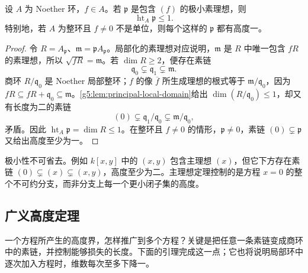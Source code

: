 \begin{theorem}\label{g5:thm:principal-ideal}
	设 \(A\) 为 Noether 环，\(f\in A\)。若 \(\mathfrak p\) 是包含 \((f)\) 的极小素理想，则
	\[
	\operatorname{ht}_A\mathfrak p\leq1.
	\]
	特别地，若 \(A\) 为整环且 \(f\ne0\) 不是单位，则每个这样的 \(\mathfrak p\) 都有高度一。
\end{theorem}
\begin{proof}
	令 \(R=A_{\mathfrak p}\)、\(\mathfrak m=\mathfrak pA_{\mathfrak p}\)。局部化的素理想对应说明，\(\mathfrak m\) 是 \(R\) 中唯一包含 \(fR\) 的素理想，所以 \(\sqrt{fR}=\mathfrak m\)。若 \(\dim R\geq2\)，便存在素链
	\[
	\mathfrak q_0\subsetneq\mathfrak q_1\subsetneq\mathfrak m.
	\]
	商环 \(R/\mathfrak q_0\) 是 Noether 局部整环；\(f\) 的像 \(\overline f\) 所生成理想的根式等于 \(\mathfrak m/\mathfrak q_0\)，因为 \(fR\subseteq fR+\mathfrak q_0\subseteq\mathfrak m\)。\cref{g5:lem:principal-local-domain}给出 \(\dim(R/\mathfrak q_0)\leq1\)，却又有长度为二的素链
	\[
	(0)\subsetneq\mathfrak q_1/\mathfrak q_0
	\subsetneq\mathfrak m/\mathfrak q_0,
	\]
	矛盾。因此 \(\operatorname{ht}_A\mathfrak p=\dim R\leq1\)。在整环且 \(f\ne0\) 的情形，\(\mathfrak p\ne0\)，素链 \((0)\subsetneq\mathfrak p\) 又给出高度至少为一。
\end{proof}

极小性不可省去。例如 \(k[x,y]\) 中的 \((x,y)\) 包含主理想 \((x)\)，但它下方存在素链 \((0)\subsetneq(x)\subsetneq(x,y)\)，高度至少为二。主理想定理控制的是方程 \(x=0\) 的整个不可约分支，而非分支上每一个更小闭子集的高度。

\subsection{广义高度定理}
\label{g5:subsec:0303:03}

一个方程所产生的高度界，怎样推广到多个方程？关键是把任意一条素链变成商环中的素链，并控制能够损失的长度。下面的引理完成这一点；它也将说明局部环中逐次加入方程时，维数每次至多下降一。


